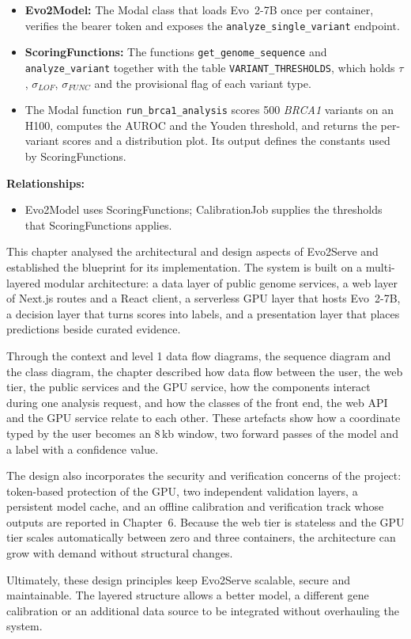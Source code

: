 \begin{itemize}
\item \textbf{Evo2Model:} The Modal class that loads Evo~2-7B once per container, verifies the bearer token and exposes the \texttt{analyze\_single\_variant} endpoint.
\item \textbf{ScoringFunctions:} The functions \texttt{get\_genome\_sequence} and \texttt{analyze\_variant} together with the table \texttt{VARIANT\_THRESHOLDS}, which holds $\tau$, $\sigma_{LOF}$, $\sigma_{FUNC}$ and the provisional flag of each variant type.
\end{itemize}

\begin{itemize}
\item The Modal function \texttt{run\_brca1\_analysis} scores 500 \textit{BRCA1} variants on an H100, computes the AUROC and the Youden threshold, and returns the per-variant scores and a distribution plot. Its output defines the constants used by ScoringFunctions.
\end{itemize}
\textbf{Relationships:}
\begin{itemize}
\item Evo2Model uses ScoringFunctions; CalibrationJob supplies the thresholds that ScoringFunctions applies.
\end{itemize}

\vspace{6pt}
\vspace{4pt}
This chapter analysed the architectural and design aspects of Evo2Serve and established the blueprint for its implementation. The system is built on a multi-layered modular architecture: a data layer of public genome services, a web layer of Next.js routes and a React client, a serverless GPU layer that hosts Evo~2-7B, a decision layer that turns scores into labels, and a presentation layer that places predictions beside curated evidence.

Through the context and level 1 data flow diagrams, the sequence diagram and the class diagram, the chapter described how data flow between the user, the web tier, the public services and the GPU service, how the components interact during one analysis request, and how the classes of the front end, the web API and the GPU service relate to each other. These artefacts show how a coordinate typed by the user becomes an 8\,kb window, two forward passes of the model and a label with a confidence value.

The design also incorporates the security and verification concerns of the project: token-based protection of the GPU, two independent validation layers, a persistent model cache, and an offline calibration and verification track whose outputs are reported in Chapter~6. Because the web tier is stateless and the GPU tier scales automatically between zero and three containers, the architecture can grow with demand without structural changes.

Ultimately, these design principles keep Evo2Serve scalable, secure and maintainable. The layered structure allows a better model, a different gene calibration or an additional data source to be integrated without overhauling the system.
